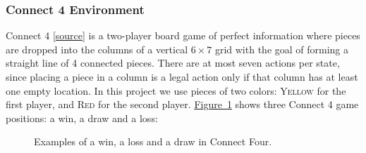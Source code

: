 \documentclass{article}
\newcommand{\GithubURL}[1]{[\href{https://github.com/davidrobles/mlnd-capstone-code/blob/master/#1}{source}]}
\begin{document}
\pagebreak[4]


\subsubsection{Connect 4 Environment}

Connect 4 \GithubURL{capstone/game/games/connect4.py} is a two-player board game of perfect
information where pieces are dropped into the columns of a vertical $6 \times 7$ grid with the goal
of forming a straight line of 4 connected pieces. There are at most seven actions per state, since
placing a piece in a column is a legal action only if that column has at least one empty location.
In this project we use pieces of two colors: \textsc{Yellow} for the first player, and \textsc{Red}
for the second player. \hyperref[fig:c4-env]{Figure~\ref*{fig:c4-env}} shows three Connect 4 game
positions: a win, a draw and a loss:


\begin{figure}[!h]
    \centering
     \hspace{0.1in}
     \hspace{0.1in}
    \caption{Examples of a win, a loss and a draw in Connect Four.}
    \label{fig:c4-env}
\end{figure}
\end{document}
